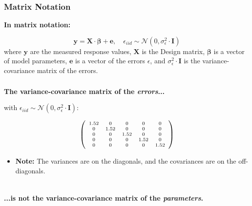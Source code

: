 \documentclass{beamer}
\begin{document}
\begin{frame}
  \frametitle{Matrix Notation}
  \textbf{In matrix notation:}
  
  \begin{equation*}
  \mathbf{y} = \mathbf{X} \cdot \mathbf{\beta} + \mathbf{e}, \quad \epsilon_{iid} \sim \mathcal{N}(0, \sigma^2_{\epsilon} \cdot \mathbf{I})
  \end{equation*}
  where $\mathbf{y}$ are the measured response values, $\mathbf{X}$ is the Design matrix, $\mathbf{\beta}$ is a vector of model parameters, $\mathbf{e}$ is a vector of the errors $\epsilon$, and $\sigma^2_{\epsilon} \cdot \mathbf{I}$ is the variance-covariance matrix of the errors.
\end{frame}

\begin{frame}
  \frametitle{}
  \textbf{The variance-covariance matrix of the \textit{errors}...}

  with $\epsilon_{iid} \sim \mathcal{N}(0, \sigma^2_{\epsilon} \cdot \mathbf{I})$:
  \vspace{0.5cm}
  
  \begin{equation*}
  \scriptsize{\left( \begin{array}{ccccc} 1.52 & 0 & 0 & 0 & 0 \\ 0 & 1.52 & 0 & 0 & 0 \\ 0 & 0 & 1.52 & 0 & 0 \\ 0 & 0 & 0 & 1.52 & 0 \\ 0 & 0 & 0 & 0 & 1.52 \end{array}\right)}
  \end{equation*}
 \vspace{0.5cm}
 
  \begin{itemize}
    \item \textbf{Note:} The variances are on the diagonals, and the covariances are on the off-diagonals.
  \end{itemize}
\end{frame}

\begin{frame}
  \frametitle{}
  \begin{columns}
      \begin{column}{0.5\textwidth}
        \textbf{...is not the variance-covariance matrix of the \textit{parameters}.}
      \end{column}
      \begin{column}{0.5\textwidth}
      \end{column}
  \end{columns}


\end{frame}
\end{document}

